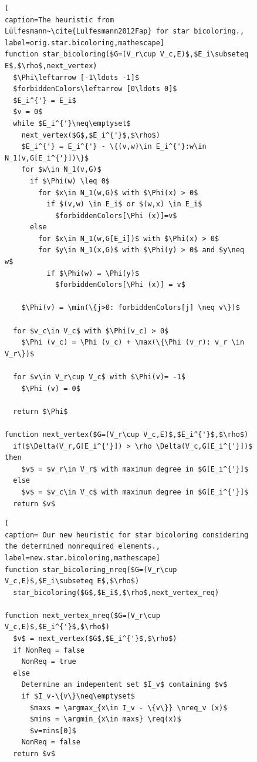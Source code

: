 \documentclass[12pt, twoside,a4paper,toc=bibliography]{scrbook}
\DeclareMathOperator*{\argmin}{arg\,min}
\DeclareMathOperator*{\argmax}{arg\,max}
\newcommand{\nreq}{L}
\newcommand{\req}{M}
\begin{document}
\begin{figure}
\begin{lstlisting}[
caption=The heuristic from Lülfesmann~\cite{Lulfesmann2012Fap} for star bicoloring.,
label=orig.star.bicoloring,mathescape]
function star_bicoloring($G=(V_r\cup V_c,E)$,$E_i\subseteq E$,$\rho$,next_vertex)
  $\Phi\leftarrow [-1\ldots -1]$
  $forbiddenColors\leftarrow [0\ldots 0]$
  $E_i^{'} = E_i$
  $v = 0$
  while $E_i^{'}\neq\emptyset$
    next_vertex($G$,$E_i^{'}$,$\rho$)
    $E_i^{'} = E_i^{'} - \{(v,w)\in E_i^{'}:w\in N_1(v,G[E_i^{'}])\}$
    for $w\in N_1(v,G)$
      if $\Phi(w) \leq 0$
        for $x\in N_1(w,G)$ with $\Phi(x) > 0$
          if $(v,w) \in E_i$ or $(w,x) \in E_i$
            $forbiddenColors[\Phi (x)]=v$
      else
        for $x\in N_1(w,G[E_i])$ with $\Phi(x) > 0$
        for $y\in N_1(x,G)$ with $\Phi(y) > 0$ and $y\neq w$
          if $\Phi(w) = \Phi(y)$
            $forbiddenColors[\Phi (x)] = v$
            
    $\Phi(v) = \min(\{j>0: forbiddenColors[j] \neq v\})$

  for $v_c\in V_c$ with $\Phi(v_c) > 0$
    $\Phi (v_c) = \Phi (v_c) + \max(\{\Phi (v_r): v_r \in V_r\})$

  for $v\in V_r\cup V_c$ with $\Phi(v)= -1$
    $\Phi (v) = 0$

  return $\Phi$

function next_vertex($G=(V_r\cup V_c,E)$,$E_i^{'}$,$\rho$)
  if($\Delta(V_r,G[E_i^{'}]) > \rho \Delta(V_c,G[E_i^{'}])$ then
    $v$ = $v_r\in V_r$ with maximum degree in $G[E_i^{'}]$
  else
    $v$ = $v_c\in V_c$ with maximum degree in $G[E_i^{'}]$
  return $v$
\end{lstlisting}

\begin{lstlisting}[
caption= Our new heuristic for star bicoloring considering the determined nonrequired elements.,
label=new.star.bicoloring,mathescape]
function star_bicoloring_nreq($G=(V_r\cup V_c,E)$,$E_i\subseteq E$,$\rho$)
  star_bicoloring($G$,$E_i$,$\rho$,next_vertex_req)

function next_vertex_nreq($G=(V_r\cup V_c,E)$,$E_i^{'}$,$\rho$)
  $v$ = next_vertex($G$,$E_i^{'}$,$\rho$)
  if NonReq = false
    NonReq = true
  else
    Determine an indepentent set $I_v$ containing $v$
    if $I_v-\{v\}\neq\emptyset$
      $maxs = \argmax_{x\in I_v - \{v\}} \nreq_v (x)$
      $mins = \argmin_{x\in maxs} \req(x)$ 
      $v=mins[0]$
    NonReq = false
  return $v$
\end{lstlisting}
\end{figure}
\end{document}
